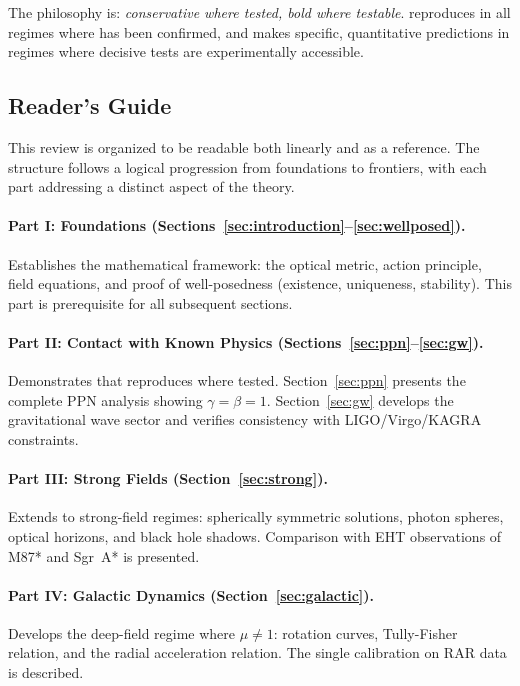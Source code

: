 The philosophy is: \emph{conservative where tested, bold where testable}. 
\DFD reproduces \GR in all regimes where \GR has been confirmed, and makes 
specific, quantitative predictions in regimes where decisive tests are 
experimentally accessible.

\subsection{Reader's Guide}\label{sec:reader_guide}

This review is organized to be readable both linearly and as a reference. 
The structure follows a logical progression from foundations to frontiers, 
with each part addressing a distinct aspect of the theory.

\paragraph{Part I: Foundations (Sections~\ref{sec:introduction}--\ref{sec:wellposed}).}
Establishes the mathematical framework: the optical metric, action principle, 
field equations, and proof of well-posedness (existence, uniqueness, stability). 
This part is prerequisite for all subsequent sections.

\paragraph{Part II: Contact with Known Physics (Sections~\ref{sec:ppn}--\ref{sec:gw}).}
Demonstrates that \DFD reproduces \GR where tested. Section~\ref{sec:ppn} 
presents the complete PPN analysis showing $\gamma = \beta = 1$. 
Section~\ref{sec:gw} develops the gravitational wave sector and verifies 
consistency with LIGO/Virgo/KAGRA constraints.

\paragraph{Part III: Strong Fields (Section~\ref{sec:strong}).}
Extends to strong-field regimes: spherically symmetric solutions, photon 
spheres, optical horizons, and black hole shadows. Comparison with EHT 
observations of M87* and Sgr~A* is presented.

\paragraph{Part IV: Galactic Dynamics (Section~\ref{sec:galactic}).}
Develops the deep-field regime where $\mu \neq 1$: rotation curves, 
Tully-Fisher relation, and the radial acceleration relation. The single 
calibration on RAR data is described.

